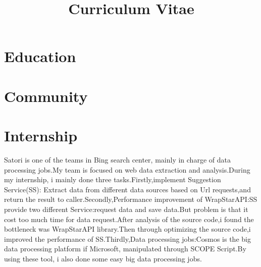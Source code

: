 \documentclass[11pt,a4paper]{moderncv}
\title{Curriculum Vitae}
\begin{document}
\maketitle

\section{Education}



\section{Community}

\section{Internship}
{Satori is one of the teams in Bing search center, mainly in charge of data processing jobs.My team is focused on web data extraction and analysis.During my internship, i mainly done three tasks.Firstly,implement Suggestion Service(SS): Extract data from different data sources based on Url requests,and return the result to caller.Secondly,Performance improvement of WrapStarAPI:SS provide two different Service:request data and save data.But problem is that it cost too much time for data request.After analysis of the source code,i found the bottleneck was WrapStarAPI library.Then through optimizing the source code,i improved the performance of  SS.Thirdly,Data processing jobs:Cosmos is the big data processing platform if Microsoft, manipulated through SCOPE Script.By using these tool, i also done some easy big data processing jobs.}
\end{document}
